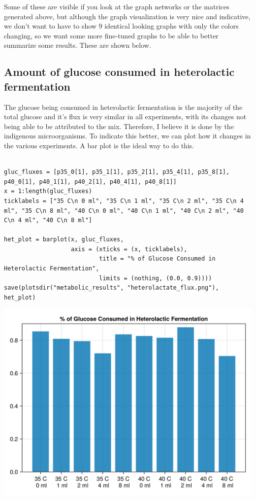 \documentclass[11pt]{article}
\begin{document}
Some of these are visible if you look at the graph networks or the matrices generated above, but although the graph visualization is very nice and indicative, we don't want to have to show 9 identical looking graphs with only the colors changing, so we want some more fine-tuned graphs to be able to better summarize some results. These are shown below.

\subsection{Amount of glucose consumed in heterolactic fermentation}
\label{sec:orge53b047}
The glucose being consumed in heterolactic fermentation is the majority of the total glucose and it's flux is very similar in all experiments, with its changes not being able to be attributed to the mix. Therefore, I believe it is done by the indigenous microorganisms. To indicate this better, we can plot how it changes in the various experiments. A bar plot is the ideal way to do this.

\begin{verbatim}

gluc_fluxes = [p35_0[1], p35_1[1], p35_2[1], p35_4[1], p35_8[1], p40_0[1], p40_1[1], p40_2[1], p40_4[1], p40_8[1]]
x = 1:length(gluc_fluxes)
ticklabels = ["35 C\n 0 ml", "35 C\n 1 ml", "35 C\n 2 ml", "35 C\n 4 ml", "35 C\n 8 ml", "40 C\n 0 ml", "40 C\n 1 ml", "40 C\n 2 ml", "40 C\n 4 ml", "40 C\n 8 ml"]

het_plot = barplot(x, gluc_fluxes,
                   axis = (xticks = (x, ticklabels),
                           title = "% of Glucose Consumed in Heterolactic Fermentation",
                           limits = (nothing, (0.0, 0.9))))
save(plotsdir("metabolic_results", "heterolactate_flux.png"), het_plot)
\end{verbatim}

\begin{center}
\includegraphics[width=.9\linewidth]{../plots/metabolic_results/heterolactate_flux.png}
\end{center}
\end{document}

